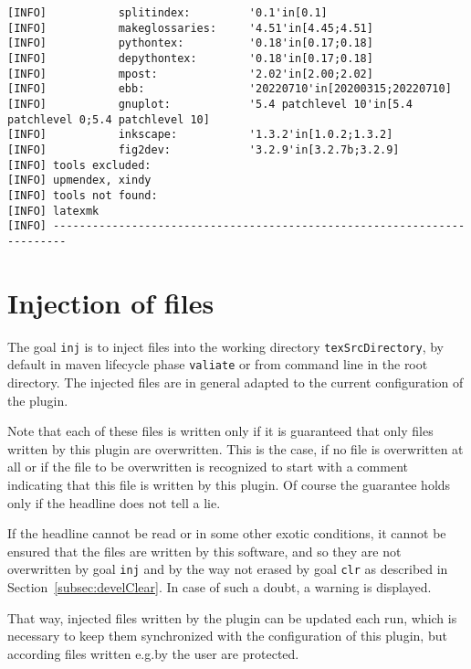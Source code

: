 \begin{lstlisting}[basicstyle=\tiny,
float, captionpos=b, label={lst:vrsOut}, 
caption={Output of goal \texttt{latex:vrs}}]
[INFO]           splitindex:         '0.1'in[0.1]
[INFO]           makeglossaries:     '4.51'in[4.45;4.51]
[INFO]           pythontex:          '0.18'in[0.17;0.18]
[INFO]           depythontex:        '0.18'in[0.17;0.18]
[INFO]           mpost:              '2.02'in[2.00;2.02]
[INFO]           ebb:                '20220710'in[20200315;20220710]
[INFO]           gnuplot:            '5.4 patchlevel 10'in[5.4 patchlevel 0;5.4 patchlevel 10]
[INFO]           inkscape:           '1.3.2'in[1.0.2;1.3.2]
[INFO]           fig2dev:            '3.2.9'in[3.2.7b;3.2.9]
[INFO] tools excluded: 
[INFO] upmendex, xindy
[INFO] tools not found: 
[INFO] latexmk
[INFO] ------------------------------------------------------------------------
\end{lstlisting}



\section{Injection of files}\label{sec:injFiles}

The goal \texttt{inj} is to inject files 
into the working directory \texttt{texSrcDirectory}, 
by default in maven lifecycle phase \texttt{valiate} 
or from command line in the root directory. 
The injected files are in general adapted to the current configuration of the plugin. 

Note that each of these files is written only 
if it is guaranteed that only files written by this plugin are overwritten. 
This is the case, if no file is overwritten at all 
or if the file to be overwritten is recognized to start with a comment 
indicating that this file is written by this plugin. 
Of course the guarantee holds only if the headline does not tell a lie. 

If the headline cannot be read or in some other exotic conditions, 
it cannot be ensured that the files are written by this software, 
and so they are not overwritten by goal \texttt{inj} 
and by the way not erased by goal 
\texttt{clr} as described in Section~\ref{subsec:develClear}. 
In case of such a doubt, a warning is displayed. 

That way, injected files written by the plugin can be updated each run, 
which is necessary to keep them synchronized with the configuration of this plugin, 
but according files written e.g.\@ by the user are protected. 

